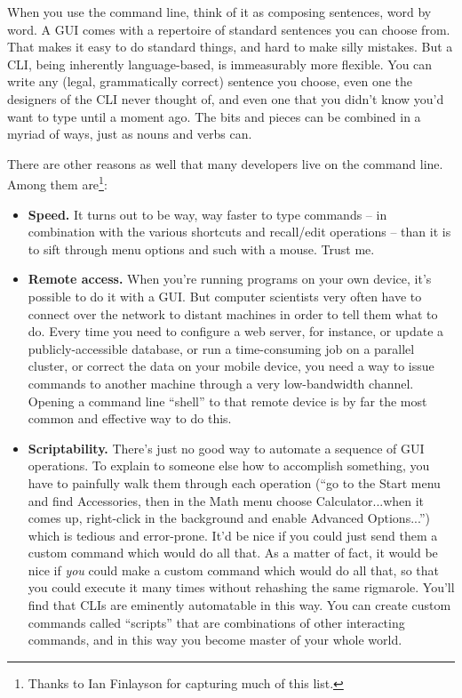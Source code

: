 When you use the command line, think of it as composing sentences, word by
word. A GUI comes with a repertoire of standard sentences you can choose from.
That makes it easy to do standard things, and hard to make silly mistakes. But
a CLI, being inherently language-based, is immeasurably more flexible. You can
write any (legal, grammatically correct) sentence you choose, even one the
designers of the CLI never thought of, and even one that you didn't know you'd
want to type until a moment ago. The bits and pieces can be combined in a
myriad of ways, just as nouns and verbs can.

There are other reasons as well that many developers live on the command line.
Among them are\footnote{Thanks to Ian Finlayson for capturing much of this
list.}:

\begin{itemize}
\itemsep.1em

\item \textbf{Speed.} It turns out to be way, way faster to type commands --
in combination with the various shortcuts and recall/edit operations -- than
it is to sift through menu options and such with a mouse. Trust me.

\item \textbf{Remote access.} When you're running programs on your own device,
it's possible to do it with a GUI. But computer scientists very often have to
connect over the network to distant machines in order to tell them what to do.
Every time you need to configure a web server, for instance, or update a
publicly-accessible database, or run a time-consuming job on a parallel
cluster, or correct the data on your mobile device, you need a way to issue
commands to another machine through a very low-bandwidth channel. Opening a
command line ``shell'' to that remote device is by far the most common and
effective way to do this.

\item \textbf{Scriptability.} There's just no good way to automate a sequence
of GUI operations. To explain to someone else how to accomplish something, you
have to painfully walk them through each operation (``go to the Start menu and
find Accessories, then in the Math menu choose Calculator...when it comes up,
right-click in the background and enable Advanced Options...'') which is
tedious and error-prone. It'd be nice if you could just send them a custom
command which would do all that. As a matter of fact, it would be nice if
\textit{you} could make a custom command which would do all that, so that you
could execute it many times without rehashing the same rigmarole. You'll find
that CLIs are eminently automatable in this way. You can create custom
commands called ``scripts'' that are combinations of other interacting
commands, and in this way you become master of your whole world.


\end{itemize}
